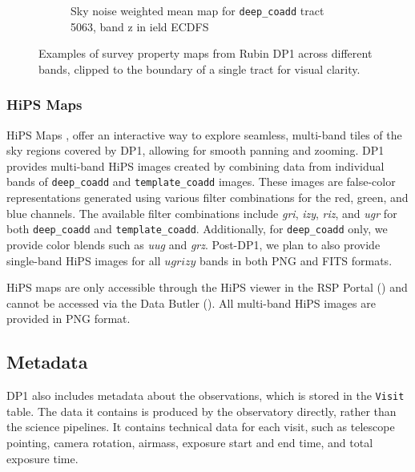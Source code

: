 \begin{figure}[hbt!]
\begin{subfigure}[t]{0.31\textwidth}
  \caption{Sky noise weighted mean map for \texttt{deep\_coadd} \gls{tract} 5063, band z in ield ECDFS}
  \end{subfigure}\hfill
\caption{Examples of survey property maps from Rubin DP1 across different bands, clipped to the boundary of a single \gls{tract} for visual clarity.}
  \label{fig:survey_property_maps}
\end{figure}

\subsubsection{HiPS Maps}
HiPS Maps \citep{2015A&A...578A.114F}, offer an interactive way to explore seamless, multi-band tiles of the sky regions covered by \gls{DP1}, allowing for smooth panning and zooming.
\gls{DP1} provides multi-band HiPS images created by combining data from individual bands of \texttt{deep\_coadd} and \texttt{template\_coadd} images.
These images are false-color representations generated using various filter combinations for the red, green, and blue channels.
The available filter combinations include \textit{gri}, \textit{izy}, \textit{riz}, and \textit{ugr} for both \texttt{deep\_coadd} and \texttt{template\_coadd}.
Additionally, for \texttt{deep\_coadd} only, we provide color blends such as \textit{uug} and \textit{grz}.
Post-DP1, we plan to also provide single-band HiPS images for all $ugrizy$ bands in both \gls{PNG} and FITS formats.

HiPS maps are only accessible through the HiPS viewer in the \gls{RSP} Portal () and cannot be accessed via the Data Butler ().
All multi-band HiPS images are provided in \gls{PNG} format.

\subsection{Metadata
\label{ssec:metadata}}

\gls{DP1} also includes metadata about the observations, which is stored in the \texttt{Visit} table. The data it contains is produced by the observatory directly, rather than the science pipelines.
It contains technical data for each visit, such as telescope pointing, camera rotation, \gls{airmass}, exposure start and end time, and total exposure time.

